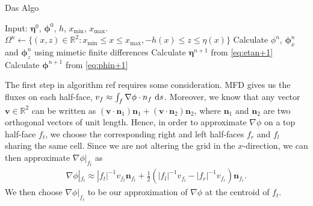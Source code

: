 \documentclass[12pt]{article}
\begin{document}
\begin{algorithm}
    \caption{Das Algo}
	\begin{algorithmic}[1]
	\State    Input: $\bm{\eta}^0$, $\bm{\phi}^0$, $h$, $x_{\min}$, $x_{\max}$.
	        \State    $\Omega^n \leftarrow \{(x,z) \in \mathbb{R}^2 : x_{\min} \leq x \leq x_{\max}, -h(x) \leq z \leq \eta(x)\}$ 
			\State    Calculate $\phi^{n}$, $\bm{\phi}_x^n$ and $\bm{\phi}_z^n$ using mimetic finite differences
			\State    Calculate $\bm{\eta}^{n+1}$ from \eqref{eq:etan+1}
			\State    Calculate $\bm{\phi}^{n+1}$ from \eqref{eq:phin+1}
        \EndFor
	\end{algorithmic}
\end{algorithm}

The first step in algorithm ref requires some consideration. MFD gives us the fluxes on each half-face, $v_{f} \approx \int_{f} \nabla \phi \cdot n_{f} \, \operatorname{d}\! s$.
Moreover, we know that any vector $\bm{v} \in \mathbb{R}^2$ can be written as $(\bm{v}\cdot\bm{n}_1) \bm{n}_1 + (\bm{v}\cdot\bm{n}_2) \bm{n}_2$,
where $\bm{n}_1$ and $\bm{n}_2$ are two orthogonal vectors of unit length.
Hence, in order to approximate $\nabla \phi$ on a top half-face $f_t$, we choose the corresponding right and left half-faces $f_r$ and $f_l$ sharing the same cell.
Since we are not altering the grid in the $x$-direction, we can then approximate $\nabla \phi|_{f_t}$ as
\begin{align*}
    \nabla \phi|_{f_t} \approx |f_t|^{-1} v_{f_t} \bm{n}_{f_t} + \frac{1}{2}(|f_l|^{-1}v_{f_l}-|f_r|^{-1}v_{f_r})\bm{n}_{f_r}.
\end{align*}
We then choose $\nabla \phi|_{f_t}$ to be our approximation of $\nabla \phi$ at the centroid of $f_t$.
\end{document}
